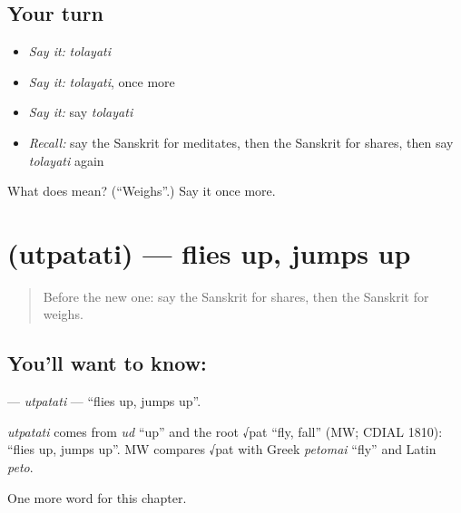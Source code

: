 \subsection*{Your turn}
\begin{itemize}
\raggedright
  \item \emph{Say it:} \emph{tolayati}
  \item \emph{Say it:} \emph{tolayati}, once more
  \item \emph{Say it:} say \emph{tolayati}
  \item \emph{Recall:} say the Sanskrit for meditates, then the Sanskrit for shares, then say \emph{tolayati} again
\end{itemize}

\begin{tcolorbox}[breakable,colback=teal!4,colframe=teal!35!black,title={Before you move on}]
What does  mean? (\textquotedblleft{}Weighs\textquotedblright{}.) Say it once more.
\end{tcolorbox}
\section[\texorpdfstring{\sk{उत्पतति} (utpatati)}{उत्पतति (utpatati)}]{ (utpatati) — flies up, jumps up}

\label{lesson:SA-C144-utpatati}



\begin{quote}
Before the new one: say the Sanskrit for shares, then the Sanskrit for weighs.
\end{quote}

\subsection*{You'll want to know: }
\textbf{} — \emph{utpatati} — \textquotedblleft{}flies up, jumps up\textquotedblright{}.

\begin{cousinweb}
\emph{utpatati} comes from \emph{ud} \textquotedblleft{}up\textquotedblright{} and the root √pat \textquotedblleft{}fly, fall\textquotedblright{} (MW; CDIAL 1810): \textquotedblleft{}flies up, jumps up\textquotedblright{}. MW compares √pat with Greek \emph{petomai} \textquotedblleft{}fly\textquotedblright{} and Latin \emph{peto}.
\end{cousinweb}

\begin{grammarlens}[title={What you've built}]
One more word for this chapter.
\end{grammarlens}

